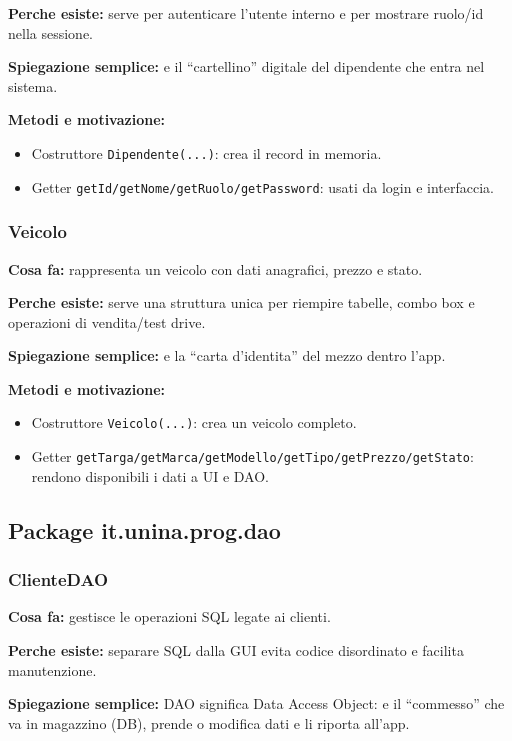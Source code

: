 \documentclass[12pt,a4paper]{article}
\begin{document}
\textbf{Perche esiste:}
serve per autenticare l'utente interno e per mostrare ruolo/id nella sessione.

\textbf{Spiegazione semplice:}
e il ``cartellino'' digitale del dipendente che entra nel sistema.

\textbf{Metodi e motivazione:}
\begin{itemize}
  \item Costruttore \texttt{Dipendente(...)}: crea il record in memoria.
  \item Getter \texttt{getId/getNome/getRuolo/getPassword}: usati da login e interfaccia.
\end{itemize}

\subsubsection*{Veicolo}
\textbf{Cosa fa:}
rappresenta un veicolo con dati anagrafici, prezzo e stato.

\textbf{Perche esiste:}
serve una struttura unica per riempire tabelle, combo box e operazioni di vendita/test drive.

\textbf{Spiegazione semplice:}
e la ``carta d'identita'' del mezzo dentro l'app.

\textbf{Metodi e motivazione:}
\begin{itemize}
  \item Costruttore \texttt{Veicolo(...)}: crea un veicolo completo.
  \item Getter \texttt{getTarga/getMarca/getModello/getTipo/getPrezzo/getStato}: rendono disponibili i dati a UI e DAO.
\end{itemize}

\subsection{Package it.unina.prog.dao}

\subsubsection*{ClienteDAO}
\textbf{Cosa fa:}
gestisce le operazioni SQL legate ai clienti.

\textbf{Perche esiste:}
separare SQL dalla GUI evita codice disordinato e facilita manutenzione.

\textbf{Spiegazione semplice:}
DAO significa Data Access Object: e il ``commesso'' che va in magazzino (DB), prende o modifica dati e li riporta all'app.
\end{document}
